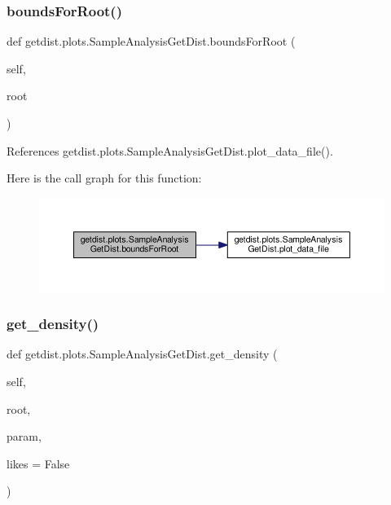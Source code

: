 \subsubsection{\texorpdfstring{bounds\+For\+Root()}{boundsForRoot()}}
{\footnotesize\ttfamily def getdist.\+plots.\+Sample\+Analysis\+Get\+Dist.\+bounds\+For\+Root (\begin{DoxyParamCaption}\item[{}]{self,  }\item[{}]{root }\end{DoxyParamCaption})}



References getdist.\+plots.\+Sample\+Analysis\+Get\+Dist.\+plot\+\_\+data\+\_\+file().

Here is the call graph for this function\+:
\nopagebreak
\begin{figure}[H]
\begin{center}
\leavevmode
\includegraphics[width=350pt]{classgetdist_1_1plots_1_1SampleAnalysisGetDist_a34f3bd56dc36332ccb2b2274a628143a_cgraph}
\end{center}
\end{figure}
\mbox{\label{classgetdist_1_1plots_1_1SampleAnalysisGetDist_a0d7a9bedcc6b45701298597a18ce3d9e}} 
\subsubsection{\texorpdfstring{get\+\_\+density()}{get\_density()}}
{\footnotesize\ttfamily def getdist.\+plots.\+Sample\+Analysis\+Get\+Dist.\+get\+\_\+density (\begin{DoxyParamCaption}\item[{}]{self,  }\item[{}]{root,  }\item[{}]{param,  }\item[{}]{likes = {\ttfamily False} }\end{DoxyParamCaption})}




